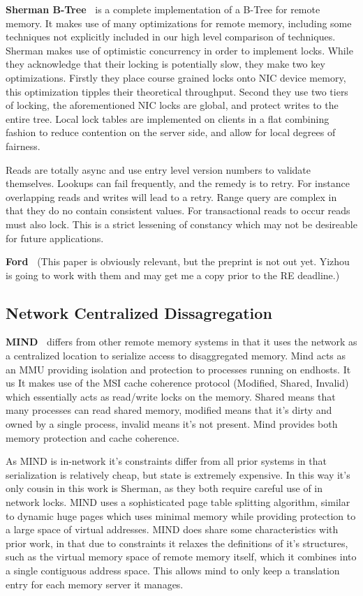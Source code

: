 \textbf{Sherman B-Tree~\cite{sherman}}
is a complete implementation of a B-Tree for remote memory.
It makes use of many optimizations for remote memory, including some techniques
not explicitly included in our high level comparison of techniques. Sherman
makes use of optimistic concurrency in order to implement locks. While they
acknowledge that their locking is potentially slow, they make two key
optimizations. Firstly they place course grained locks onto NIC device memory,
this optimization tipples their theoretical throughput. Second they use two
tiers of locking, the aforementioned NIC locks are global, and protect writes to the
entire tree. Local lock tables are implemented on clients in a flat combining
fashion to reduce contention on the server side, and allow for local degrees of
fairness.

Reads are totally async and use entry level version numbers to validate
themselves. Lookups can fail frequently, and the remedy is to retry. For
instance overlapping reads and writes will lead to a retry. Range query are
complex in that they do no contain consistent values. For transactional reads to
occur reads must also lock. This is a strict lessening of constancy which may
not be desireable for future applications.

\textbf{Ford~\cite{ford}}
(This paper is obviously relevant, but the preprint is not out yet. Yizhou is
going to work with them and may get me a copy prior to the RE deadline.)

\subsection{Network Centralized Dissagregation}

\textbf{MIND~\cite{mind}}
differs from other remote memory systems in that it uses the network as a
centralized location to serialize access to disaggregated memory. Mind acts as an
MMU providing isolation and protection to processes running on endhosts. It us  
It makes use of the MSI cache coherence protocol (Modified, Shared, Invalid)
which essentially acts as read/write locks on the memory. Shared means that many
processes can read shared memory, modified means that it's dirty and owned by a
single process, invalid means it's not present. Mind provides both memory
protection and cache coherence. 

As MIND is in-network it's constraints differ from all prior systems in that
serialization is relatively cheap, but state is extremely expensive. In this way
it's only cousin in this work is Sherman, as they both require careful use of in
network locks. MIND uses a sophisticated page table splitting algorithm, similar
to dynamic huge pages which uses minimal memory while providing protection to a
large space of virtual addresses. MIND does share some characteristics with
prior work, in that due to constraints it relaxes the definitions of it's
structures, such as the virtual memory space of remote memory itself, which it
combines into a single contiguous address space. This allows mind to only keep a
translation entry for each memory server it manages.


